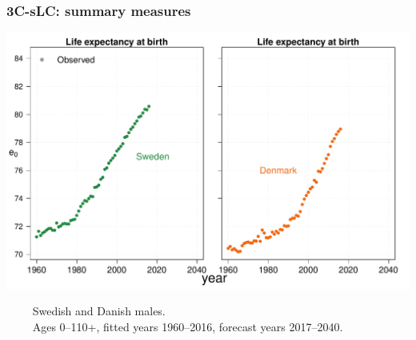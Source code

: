 \documentclass[12pt, xcolor=table]{beamer}  %
\begin{document}
\begin{frame}\frametitle{3C-sLC: summary measures}

\vspace{-0.5cm}
	
	\begin{center}	
		\vspace{0.4cm}
		
		\includegraphics[scale=.42]{Figures/Ch5/F1_1_M}
		
	\end{center}

\vspace{-0.3cm}
\tiny{$\quad\quad$ Swedish and Danish males. \\ $\quad\quad$ Ages 0--110+, fitted years 1960--2016, forecast years 2017--2040.}
	
\end{frame}
\end{document}
